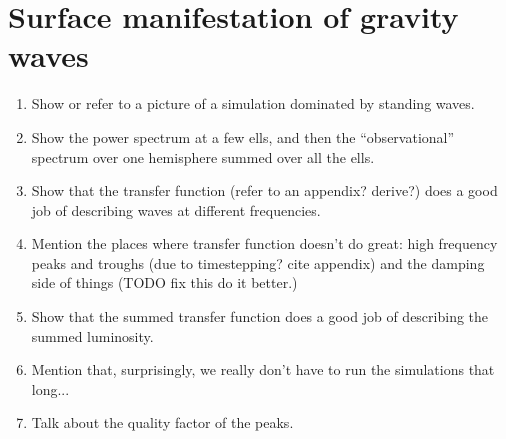 \section{Surface manifestation of gravity waves}
\label{sec:results_surface}

\begin{enumerate}
\item Show or refer to a picture of a simulation dominated by standing waves.
\item Show the power spectrum at a few ells, and then the ``observational'' spectrum over one hemisphere summed over all the ells.
\item Show that the transfer function (refer to an appendix? derive?) does a good job of describing waves at different frequencies.
\item Mention the places where transfer function doesn't do great: high frequency peaks and troughs (due to timestepping? cite appendix) and the damping side of things (TODO fix this do it better.)
\item Show that the summed transfer function does a good job of describing the summed luminosity.
\item Mention that, surprisingly, we really don't have to run the simulations that long...
\item Talk about the quality factor of the peaks.
\end{enumerate}


